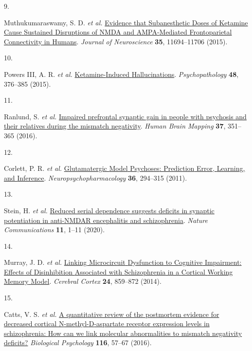 \documentclass[
]{article}
\newlength{\cslhangindent}
\newlength{\csllabelwidth}
\newenvironment{CSLReferences}[2] %
 {\begin{list}{}{%
  \setlength{\itemindent}{0pt}
  \setlength{\leftmargin}{0pt}
  \setlength{\parsep}{0pt}
  \ifodd #1
   \setlength{\leftmargin}{\cslhangindent}
   \setlength{\itemindent}{-1\cslhangindent}
  \fi
  \setlength{\itemsep}{#2\baselineskip}}}
 {\end{list}}
\newcommand{\CSLLeftMargin}[1]{\parbox[t]{\csllabelwidth}{\strut#1\strut}}
\newcommand{\CSLRightInline}[1]{\parbox[t]{\linewidth - \csllabelwidth}{\strut#1\strut}}
\begin{document}
\begin{CSLReferences}{0}{0}
\CSLLeftMargin{9. }%
\CSLRightInline{Muthukumaraswamy, S. D. \emph{et al.}
\href{https://doi.org/10.1523/JNEUROSCI.0903-15.2015}{Evidence that
{Subanesthetic} {Doses} of {Ketamine} {Cause} {Sustained} {Disruptions}
of {NMDA} and {AMPA}-{Mediated} {Frontoparietal} {Connectivity} in
{Humans}}. \emph{Journal of Neuroscience} \textbf{35}, 11694--11706
(2015).}

\CSLLeftMargin{10. }%
\CSLRightInline{Powers III, A. R. \emph{et al.}
\href{https://doi.org/10.1159/000438675}{Ketamine-{Induced}
{Hallucinations}}. \emph{Psychopathology} \textbf{48}, 376--385 (2015).}

\CSLLeftMargin{11. }%
\CSLRightInline{Ranlund, S. \emph{et al.}
\href{https://doi.org/10.1002/hbm.23035}{Impaired prefrontal synaptic
gain in people with psychosis and their relatives during the mismatch
negativity}. \emph{Human Brain Mapping} \textbf{37}, 351--365 (2016).}

\CSLLeftMargin{12. }%
\CSLRightInline{Corlett, P. R. \emph{et al.}
\href{https://doi.org/10.1038/npp.2010.163}{Glutamatergic {Model}
{Psychoses}: {Prediction} {Error}, {Learning}, and {Inference}}.
\emph{Neuropsychopharmacology} \textbf{36}, 294--315 (2011).}

\CSLLeftMargin{13. }%
\CSLRightInline{Stein, H. \emph{et al.}
\href{https://doi.org/10.1038/s41467-020-18033-3}{Reduced serial
dependence suggests deficits in synaptic potentiation in anti-{NMDAR}
encephalitis and schizophrenia}. \emph{Nature Communications}
\textbf{11}, 1--11 (2020).}

\CSLLeftMargin{14. }%
\CSLRightInline{Murray, J. D. \emph{et al.}
\href{https://doi.org/10.1093/cercor/bhs370}{Linking {Microcircuit}
{Dysfunction} to {Cognitive} {Impairment}: {Effects} of {Disinhibition}
{Associated} with {Schizophrenia} in a {Cortical} {Working} {Memory}
{Model}}. \emph{Cerebral Cortex} \textbf{24}, 859--872 (2014).}

\CSLLeftMargin{15. }%
\CSLRightInline{Catts, V. S. \emph{et al.}
\href{https://doi.org/10.1016/j.biopsycho.2015.10.013}{A quantitative
review of the postmortem evidence for decreased cortical
{N}-methyl-{D}-aspartate receptor expression levels in schizophrenia:
{How} can we link molecular abnormalities to mismatch negativity
deficits?} \emph{Biological Psychology} \textbf{116}, 57--67 (2016).}


\end{CSLReferences}
\end{document}
